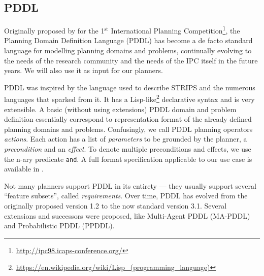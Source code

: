 \subsection{PDDL}\label{pddl}

Originally proposed by \citet{McDermott1998} for the 1$^{\mathrm{st}}$ International Planning
Competition\footnote{\url{http://ipc98.icaps-conference.org/}},
the Planning Domain Definition Language (PDDL) has become
a de facto standard language for modelling planning domains and problems,
continually evolving to the needs of the  
research community and the needs of the IPC itself in the future years.
We will also use it as input for our planners.

PDDL was inspired by the language used to describe STRIPS \citep{Fikes1971}
and the numerous languages that sparked from it.
It has a Lisp-like\footnote{\url{https://en.wikipedia.org/wiki/Lisp_(programming_language)}}
declarative syntax and is very extensible.
A basic (without using extensions) PDDL domain and problem definition essentially correspond to representation format of the already defined planning domains and problems. Confusingly, we call PDDL planning operators \textit{actions}.
Each action has a list of \textit{parameters} to be grounded by the planner,
a \textit{precondition} and an \textit{effect}. To denote multiple
preconditions and effects, we use the n-ary predicate \texttt{and}.
A full format specification applicable to our use case is available in \citet[Appendix A]{Fox2003}.

Not many planners support PDDL in its entirety --- they usually support 
several ``feature subsets'', called \textit{requirements}.
Over time, PDDL has evolved from the originally proposed version 1.2
to the now standard version 3.1. Several extensions and successors were proposed,
like Multi-Agent PDDL
(MA-PDDL) and
Probabilistic PDDL
(PPDDL).

